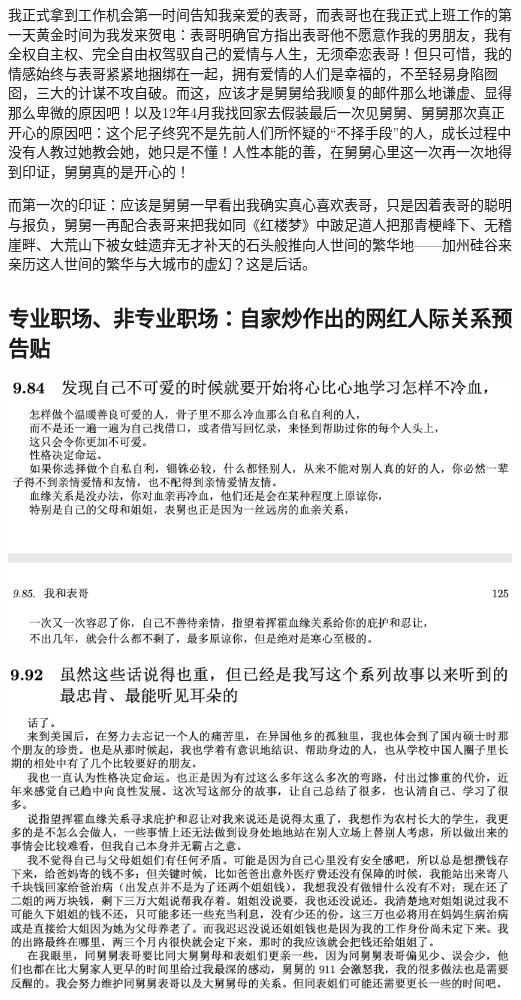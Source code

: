 \documentclass[9pt, b5paper]{article}
\begin{document}
我正式拿到工作机会第一时间告知我亲爱的表哥，而表哥也在我正式上班工作的第一天黄金时间为我发来贺电：表哥明确官方指出表哥他不愿意作我的男朋友，我有全权自主权、完全自由权驾驭自己的爱情与人生，无须牵恋表哥！但只可惜，我的情感始终与表哥紧紧地捆绑在一起，拥有爱情的人们是幸福的，不至轻易身陷囫囵，三大的计谋不攻自破。而这，应该才是舅舅给我顺复的邮件那么地谦虚、显得那么卑微的原因吧！以及12年4月我找回家去假装最后一次见舅舅、舅舅那次真正开心的原因吧：这个尼子终究不是先前人们所怀疑的“不择手段”的人，成长过程中没有人教过她教会她，她只是不懂！人性本能的善，在舅舅心里这一次再一次地得到印证，舅舅真的是开心的！

而第一次的印证：应该是舅舅一早看出我确实真心喜欢表哥，只是因着表哥的聪明与报负，舅舅一再配合表哥来把我如同《红楼梦》中跛足道人把那青梗峰下、无稽崖畔、大荒山下被女蛙遗弃无才补天的石头般推向人世间的繁华地——加州硅谷来亲历这人世间的繁华与大城市的虚幻？这是后话。 

\subsection{专业职场、非专业职场：自家炒作出的网红人际关系预告贴}
\label{sec:orgaf0c38f}

\begin{center}
\includegraphics[width=.9\linewidth]{./pic/p1p125.png}
\end{center}

\begin{center}
\includegraphics[width=.9\linewidth]{./pic/p1p128-3.png}
\end{center}
\end{document}
